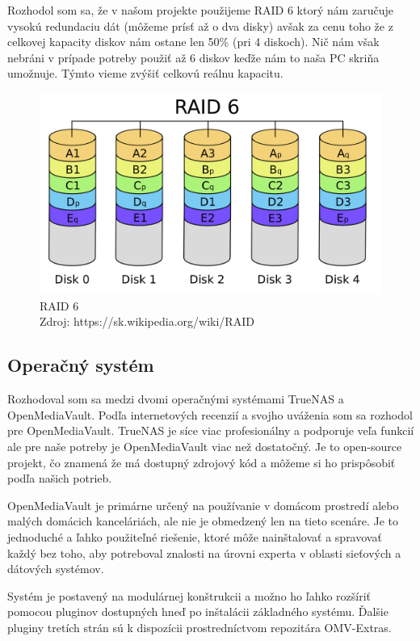 \documentclass[12pt,oneside,slovak,a4paper]{article}
\begin{document}
Rozhodol som sa, že v našom projekte použijeme RAID 6 ktorý nám zaručuje vysokú redundaciu dát (môžeme prísť až o dva disky) avšak za cenu toho že z celkovej kapacity diskov nám ostane len 50\% (pri 4 diskoch). Nič nám však nebráni v prípade potreby použiť až 6 diskov keďže nám to naša PC skriňa umožnuje. Týmto vieme zvýšiť celkovú reálnu kapacitu.

\begin{figure}[H]
	\centering
	\captionsetup{justification=centering,margin=2cm}
	\includegraphics[width=\linewidth]{./images/RAID_6.png} %
	\centering
	\caption{RAID 6 \\ Zdroj: https://sk.wikipedia.org/wiki/RAID}
\end{figure}

\subsection{Operačný systém}
Rozhodoval som sa medzi dvomi operačnými systémami TrueNAS a OpenMediaVault. Podľa internetových recenzií a svojho uváženia som sa rozhodol pre OpenMediaVault. TrueNAS je síce viac profesionálny a podporuje veľa funkcií ale pre naše potreby je OpenMediaVault viac než dostatočný. Je to open-source projekt, čo znamená že má dostupný zdrojový kód a môžeme si ho prispôsobiť podľa našich potrieb.

OpenMediaVault je primárne určený na používanie v domácom prostredí alebo malých domácich kanceláriách, ale nie je obmedzený len na tieto scenáre. Je to jednoduché a ľahko použiteľné riešenie, ktoré môže nainštalovať a spravovať každý bez toho, aby potreboval znalosti na úrovni experta v oblasti sieťových a dátových systémov.

Systém je postavený na modulárnej konštrukcii a možno ho ľahko rozšíriť pomocou pluginov dostupných hneď po inštalácii základného systému. Ďalšie pluginy tretích strán sú k dispozícii prostredníctvom repozitára OMV-Extras.
\end{document}
